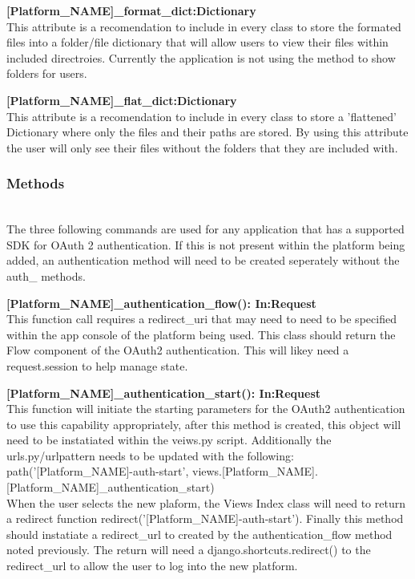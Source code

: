 \textbf{[Platform\_NAME]\_format\_dict:Dictionary} \\
This attribute is a recomendation to include in every class to store the formated files into a folder/file dictionary that will allow 
users to view their files within included directroies. Currently the application is not using the method to show folders for users.

\textbf{[Platform\_NAME]\_flat\_dict:Dictionary} \\
This attribute is a recomendation to include in every class to store a 'flattened' Dictionary where only the files and their paths are 
stored. By using this attribute the user will only see their files without the folders that they are included with. 

\subsubsection{Methods} \\
   The three following commands are used for any application that has a supported SDK for OAuth 2 authentication. If this is not present
   within the platform being added, an authentication method will need to be created seperately without the auth\_ methods.

\textbf{[Platform\_NAME]\_authentication\_flow(): In:Request} \\
This function call requires a redirect_uri that may need to need to be specified within the app console 
of the platform being used. This class should return the Flow component of the OAuth2 authentication. This 
will likey need a request.session to help manage state.

\textbf{[Platform\_NAME]\_authentication\_start(): In:Request} \\
This function will initiate the starting parameters for the OAuth2 authentication to use this 
capability appropriately, after this method is created, this object will need to be instatiated
within the veiws.py script. Additionally the urls.py/urlpattern needs to be updated with the following: \\
  path('[Platform_NAME]-auth-start', views.[Platform_NAME].[Platform_NAME]_authentication_start) \\
When the user selects the new plaform, the Views Index class will need to return a redirect function
redirect('[Platform_NAME]-auth-start'). Finally this method should instatiate a redirect_url to created by the 
authentication_flow method noted previously. The return will need a django.shortcuts.redirect() to the redirect_url 
to allow the user to log into the new platform.

